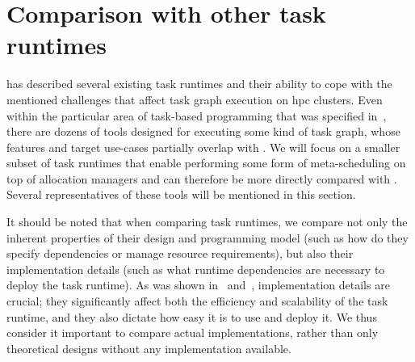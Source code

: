 \section{Comparison with other task runtimes}
\label{hq:related-work}
 has described several existing task runtimes and their ability to cope
with the mentioned challenges that affect task graph execution on \gls{hpc}
clusters. Even within the particular area of task-based programming that was specified
in~, there are dozens of tools designed for executing some kind of task
graph, whose features and target use-cases partially overlap with \hyperqueue{}. We will
focus on a smaller subset of task runtimes that enable performing some form of meta-scheduling on
top of allocation managers and can therefore be more directly compared with
\hyperqueue{}. Several representatives of these tools will be mentioned in this section.

It should be noted that when comparing task runtimes, we compare not only the inherent properties
of their design and programming model (such as how do they specify dependencies or manage resource
requirements), but also their implementation details (such as what runtime dependencies are
necessary to deploy the task runtime). As was shown in~
and~, implementation details are crucial; they significantly affect both
the efficiency and scalability of the task runtime, and they also dictate how easy it is to use and
deploy it. We thus consider it important to compare actual implementations, rather than only
theoretical designs without any implementation available.



